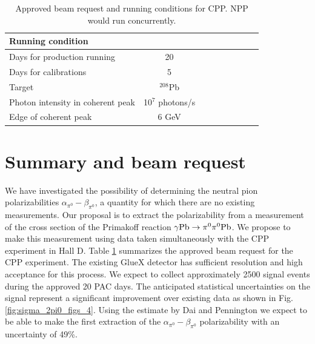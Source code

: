 \begin{table}[hbt]
\caption{Approved beam request and running conditions for CPP. NPP would run concurrently.
\label{request}
}
\begin{center}
\begin{tabular}{|l|c|c|c|c|c|c|c|c|}
\hline
\hline
  Running condition  &            \\ \hline
  Days for production running  &   20   \\ \hline
  Days for calibrations &  5       \\ \hline
  Target   & $^{208}$Pb   \\ \hline
  Photon intensity in coherent peak &   10$^7$ photons/s     \\ \hline
  Edge of coherent peak  &  6 GeV   \\ \hline
 \hline
 \hline
\end{tabular}
\end{center}
\end{table}
 
\section{Summary and beam request}
We have investigated the possibility of determining the neutral pion
polarizabilities $\alpha_{\pi^0}-\beta_{\pi^0}$, a quantity for which there are no existing measurements.
Our proposal is to extract the polarizability from a 
measurement of the cross section of the Primakoff reaction $\gamma
\rm{Pb}\rightarrow \pi^0 \pi^0 \rm{Pb}$. We propose to make this
measurement using data taken simultaneously with the CPP\cite{CPPexp}
experiment in Hall D. Table \ref{request} summarizes the approved beam request for the CPP experiment.
The existing GlueX detector has sufficient
resolution and high acceptance for this process. We expect to collect approximately 2500 signal events during the
approved 20 PAC days. The anticipated statistical uncertainties on
the signal represent a significant improvement over existing data as shown in Fig.\,\ref{fig:sigma_2pi0_figs_4}.
Using the estimate by Dai and Pennington \cite{Dai:2016ytz} we expect to be able to make the first extraction of the 
$\alpha_{\pi^0}-\beta_{\pi^0}$ polarizability with an uncertainty of 49\%.

